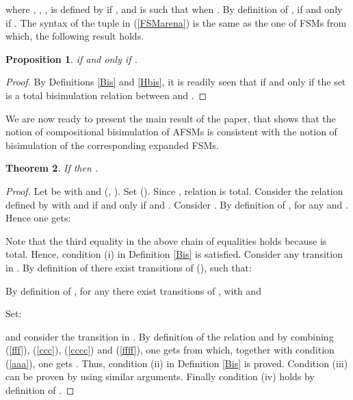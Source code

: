 \documentclass{amsart}
\newtheorem{theorem}{Theorem}[section]
\newtheorem{proposition}[theorem]{Proposition}
\theoremstyle{definition}
\theoremstyle{remark}
\numberwithin{equation}{section}
\begin{document}
where , , ,  is defined by  if , and  is such that 
 when . By definition of ,  if and only if .
The syntax of the tuple in (\ref{FSMarena}) is the same as the one of FSMs from which, the following result holds.
\begin{proposition}
\label{gio}
 if and only if . 
\end{proposition}

\begin{proof}
By Definitions \ref{Bis} and \ref{Hbis}, it is readily seen that  if and only if the set 
 is a total bisimulation relation between  and . 
\end{proof}

We are now ready to present the main result of the paper, that shows that the notion of compositional bisimulation of AFSMs is consistent with the notion of bisimulation of the corresponding expanded FSMs. 
\begin{theorem}\label{prop}
If  then . 
\end{theorem}
\begin{proof}
Let be  with   and 
 (, ). 
Set 
  (). Since , relation  is total. 
Consider the relation  defined by  with  and  if and only if  and . Consider . 
By definition of ,  for any  and . Hence one gets:

Note that the third equality in the above chain of equalities holds because  is total.
Hence, condition (i) in Definition \ref{Bis} is satisfied. Consider any transition  in . By definition of  there exist transitions  of  (), such that:

By definition of , for any  there exist transitions  of , with  and

Set:

and consider the transition   in . 
By definition of the relation  and by combining (\ref{fff}), (\ref{ccc}), (\ref{cccc}) and (\ref{ffff}), one gets  from which, together with condition (\ref{aaa}), one gets . 
Thus, condition (ii) in Definition \ref{Bis} is proved. Condition (iii) can be proven by using similar arguments. Finally condition (iv) holds by definition of . 
\end{proof}
\end{document}
